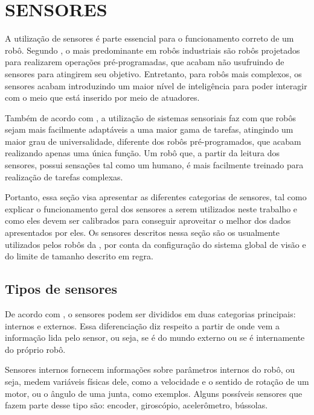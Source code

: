 \documentclass[acronym, symbols, table]{fei}
\begin{document}
	\section{SENSORES} \label{sec:sensores}
	
		A utilização de sensores é parte essencial para o funcionamento correto de um robô. Segundo \textcite{de2017tipos}, o mais predominante em robôs industriais são robôs projetados para realizarem operações pré-programadas, que acabam não usufruindo de sensores para atingirem seu objetivo. Entretanto, para robôs mais complexos, os sensores acabam introduzindo um maior nível de inteligência para poder interagir com o meio que está inserido por meio de atuadores.
		
		Também de acordo com \textcite{de2017tipos}, a utilização de sistemas sensoriais faz com que robôs sejam mais facilmente adaptáveis a uma maior gama de tarefas, atingindo um maior grau de universalidade, diferente dos robôs pré-programados, que acabam realizando apenas uma única função. Um robô que, a partir da leitura dos sensores, possui sensações tal como um humano, é mais facilmente treinado para realização de tarefas complexas.
		
		Portanto, essa seção visa apresentar as diferentes categorias de sensores, tal como explicar o funcionamento geral dos sensores a serem utilizados neste trabalho e como eles devem ser calibrados para conseguir aproveitar o melhor dos dados apresentados por eles. Os sensores descritos nessa seção são os usualmente utilizados pelos robôs da , por conta da configuração do sistema global de visão e do limite de tamanho descrito em regra.
		
		\subsection{Tipos de sensores}		
		
			De acordo com \textcite{sensorFusionKalmanFilter}, o sensores podem ser divididos em duas categorias principais: internos e externos. Essa diferenciação diz respeito a partir de onde vem a informação lida pelo sensor, ou seja, se é do mundo externo ou se é internamente do próprio robô.
			
			Sensores internos fornecem informações sobre parâmetros internos do robô, ou seja, medem variáveis físicas dele, como a velocidade e o sentido de rotação de um motor, ou o ângulo de uma junta, como exemplos. Alguns possíveis sensores que fazem parte desse tipo são: encoder, giroscópio, acelerômetro, bússolas.
			
\end{document}
